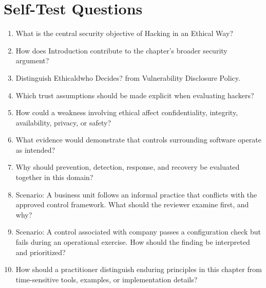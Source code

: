 \documentclass[11pt]{article}
\begin{document}
\section*{Self-Test Questions}
\begin{enumerate}
\item What is the central security objective of Hacking in an Ethical Way?
\item How does Introduction contribute to the chapter's broader security argument?
\item Distinguish Ethicaldwho Decides? from Vulnerability Disclosure Policy.
\item Which trust assumptions should be made explicit when evaluating hackers?
\item How could a weakness involving ethical affect confidentiality, integrity, availability, privacy, or safety?
\item What evidence would demonstrate that controls surrounding software operate as intended?
\item Why should prevention, detection, response, and recovery be evaluated together in this domain?
\item Scenario: A business unit follows an informal practice that conflicts with the approved control framework. What should the reviewer examine first, and why?
\item Scenario: A control associated with company passes a configuration check but fails during an operational exercise. How should the finding be interpreted and prioritized?
\item How should a practitioner distinguish enduring principles in this chapter from time-sensitive tools, examples, or implementation details?
\end{enumerate}
\end{document}
